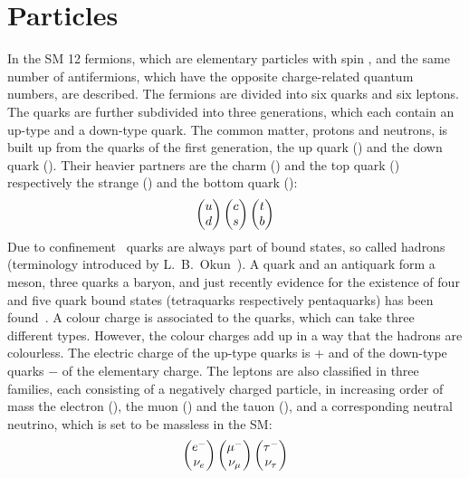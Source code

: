 
\section{Particles}
\label{sec:standardmodel:particles}

In the SM 12 fermions, which are elementary particles with spin ,
and the same number of antifermions, which have the opposite charge-related
quantum numbers, are described. The fermions are divided into six quarks and
six leptons. The quarks are further subdivided into three generations, which
each contain an up-type and a down-type quark. The common matter, protons and
neutrons, is built up from the quarks of the first generation, the up quark
(\uquark) and the down quark (\dquark). Their heavier partners are the charm
(\cquark) and the top quark (\tquark) respectively the strange (\squark) and
the bottom quark (\bquark):
\begin{align}
\begin{pmatrix}
{\ensuremath{u}} \\ {d}
\end{pmatrix}
\begin{pmatrix}
{\ensuremath{c}} \\ {s}
\end{pmatrix}
\begin{pmatrix}
{\ensuremath{t}}	\\ {b}
\end{pmatrix}
\end{align}
Due to confinement~\cite{Confinement} quarks are always part of bound states,
so called hadrons (terminology introduced by L.~B.~Okun~\cite{Okun:1962kca}).
A quark and an antiquark form a meson, three quarks a baryon, and just
recently evidence for the existence of four and five quark bound states
(tetraquarks respectively pentaquarks) has been
found~\cite{LHCb-PAPER-2016-018,*LHCb-PAPER-2016-019,LHCb-PAPER-2015-029,LHCb-PAPER-2016-015}.
A colour charge is associated to the quarks, which can take three different
types. However, the colour charges add up in a way that the hadrons are
colourless. The electric charge of the up-type quarks is + and of
the down-type quarks $-$ of the elementary charge. The leptons are
also classified in three families, each consisting of a negatively charged
particle, in increasing order of mass the electron (\electron), the muon
(\muon) and the tauon (\tauon), and a corresponding neutral neutrino, which is
set to be massless in the SM:
\begin{align}
\begin{pmatrix}
{\ensuremath{e^-}} \\ {{\nu}_e}
\end{pmatrix}
\begin{pmatrix}
{\ensuremath{\mu^-}} \\ {{\nu}_\mu}
\end{pmatrix}
\begin{pmatrix}
{\ensuremath{\tau^-}} \\ {{\nu}_\tau}
\end{pmatrix}
\end{align}

